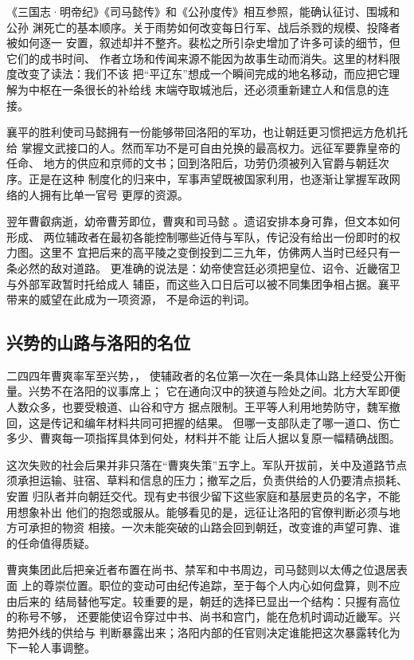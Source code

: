 《三国志·明帝纪》《司马懿传》和《公孙度传》相互参照，能确认征讨、围城和公孙
渊死亡的基本顺序。关于雨势如何改变每日行军、战后杀戮的规模、投降者被如何逐一
安置，叙述却并不整齐。裴松之所引杂史增加了许多可读的细节，但它们的成书时间、
作者立场和传闻来源不能因为故事生动而消失。这里的材料限度改变了读法：我们不该
把“平辽东”想成一个瞬间完成的地名移动，而应把它理解为中枢在一条很长的补给线
末端夺取城池后，还必须重新建立人和信息的连接。

襄平的胜利使司马懿拥有一份能够带回洛阳的军功，也让朝廷更习惯把远方危机托给
掌握文武接口的人。然而军功不是可自由兑换的最高权力。远征军要靠皇帝的任命、
地方的供应和京师的文书；回到洛阳后，功劳仍须被列入官爵与朝廷次序。正是在这种
制度化的归来中，军事声望既被国家利用，也逐渐让掌握军政网络的人拥有比单一官号
更厚的资源。

翌年曹叡病逝，幼帝曹芳即位，曹爽和司马懿
。遗诏安排本身可靠，但文本如何形成、
两位辅政者在最初各能控制哪些近侍与军队，传记没有给出一份即时的权力图。这里不
宜把后来的高平陵之变倒投到二三九年，仿佛两人当时已经只有一条必然的敌对道路。
更准确的说法是：幼帝使宫廷必须把皇位、诏令、近畿宿卫与外部军政暂时托给成人
辅臣，而这些入口日后可以被不同集团争相占据。襄平带来的威望在此成为一项资源，
不是命运的判词。

\subsection{兴势的山路与洛阳的名位}

二四四年曹爽率军至兴势，，
使辅政者的名位第一次在一条具体山路上经受公开衡量。兴势不在洛阳的议事席上；
它在通向汉中的狭道与险处之间。北方大军即便人数众多，也要受粮道、山谷和守方
据点限制。王平等人利用地势防守，魏军撤回，这是传记和编年材料共同可把握的结果。
但哪一支部队走了哪一道口、伤亡多少、曹爽每一项指挥具体到何处，材料并不能
让后人据以复原一幅精确战图。

这次失败的社会后果并非只落在“曹爽失策”五字上。军队开拔前，关中及道路节点
须承担运输、驻宿、草料和信息的压力；撤军之后，负责供给的人仍要清点损耗、安置
归队者并向朝廷交代。现有史书很少留下这些家庭和基层吏员的名字，不能用想象补出
他们的抱怨或服从。能够看见的是，远征让洛阳的官僚判断必须与地方可承担的物资
相接。一次未能突破的山路会回到朝廷，改变谁的声望可靠、谁的任命值得质疑。

曹爽集团此后把亲近者布置在尚书、禁军和中书周边，司马懿则以太傅之位退居表面
上的尊崇位置。职位的变动可由纪传追踪，至于每个人内心如何盘算，则不应由后来的
结局替他写定。较重要的是，朝廷的选择已显出一个结构：只握有高位的称号不够，
还要能使诏令穿过中书、尚书和宫门，能在危机时调动近畿军。兴势把外线的供给与
判断暴露出来；洛阳内部的任官则决定谁能把这次暴露转化为下一轮人事调整。

